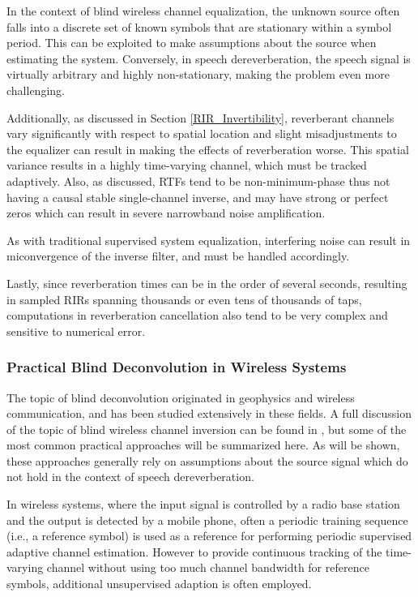 In the context of blind wireless channel equalization, the unknown source often falls into a discrete set of known symbols that are stationary within a symbol period. This can be exploited to make assumptions about the source when estimating the system. Conversely, in speech dereverberation, the speech signal is virtually arbitrary and highly non-stationary, making the problem even more challenging.

Additionally, as discussed in Section \ref{RIR_Invertibility}, reverberant channels vary significantly with respect to spatial location and slight misadjustments to the equalizer can result in making the effects of reverberation worse. This spatial variance results in a highly time-varying channel, which must be tracked adaptively. Also, as discussed, RTFs tend to be non-minimum-phase thus not having a causal stable single-channel inverse, and may have strong or perfect zeros which can result in severe narrowband noise amplification.

As with traditional supervised system equalization, interfering noise can result in miconvergence of the inverse filter, and must be handled accordingly.

Lastly, since reverberation times can be in the order of several seconds, resulting in sampled RIRs spanning thousands or even tens of thousands of taps, computations in reverberation cancellation also tend to be very complex and sensitive to numerical error.

\subsubsection{Practical Blind Deconvolution in Wireless Systems}

The topic of blind deconvolution originated in geophysics and wireless communication, and has been studied extensively in these fields. A full discussion of the topic of blind wireless channel inversion can be found in \cite{ding2018blind}, but some of the most common practical approaches will be summarized here. As will be shown, these approaches generally rely on assumptions about the source signal which do not hold in the context of speech dereverberation.

In wireless systems, where the input signal is controlled by a radio base station and the output is detected by a mobile phone, often a periodic training sequence (i.e., a reference symbol) is used as a reference for performing periodic supervised adaptive channel estimation. However to provide continuous tracking of the time-varying channel without using too much channel bandwidth for reference symbols, additional unsupervised adaption is often employed.

